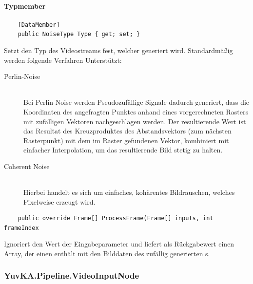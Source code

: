 \paragraph{Typmember}
\begin{itemize}

	\begin{verbatim}
	[DataMember]
	public NoiseType Type { get; set; }
	\end{verbatim}
	Setzt den Typ des Videostreams fest, welcher generiert wird. Standardmäßig werden folgende Verfahren Unterstützt:
	\begin{description}
		\item[Perlin-Noise]~\\
		Bei Perlin-Noise werden Pseudozufällige Signale dadurch generiert, dass die Koordinaten des angefragten Punktes anhand eines vorgerechneten Rasters mit zufälligen Vektoren nachgeschlagen werden. Der resultierende Wert ist das Resultat des Kreuzproduktes des Abstandsvektors (zum nächsten Rasterpunkt) mit dem im Raster gefundenen Vektor, kombiniert mit einfacher Interpolation, um das resultierende Bild stetig zu halten.
		\item[Coherent Noise]~\\
		Hierbei handelt es sich um einfaches, kohärentes Bildrauschen, welches Pixelweise erzeugt wird.
	\end{description}

	\begin{verbatim}
	public override Frame[] ProcessFrame(Frame[] inputs, int frameIndex
	\end{verbatim}
	Ignoriert den Wert der Eingabeparameter und liefert als Rückgabewert einen Array, der einen  enthält mit den Bilddaten des zufällig generierten s.


\end{itemize}

\subsubsection{YuvKA.Pipeline.VideoInputNode}
